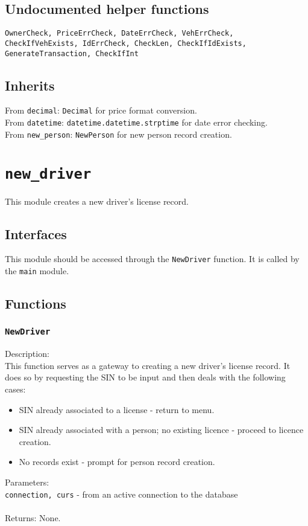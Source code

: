 \documentclass[12pt]{article}
\begin{document}
\subsection{Undocumented helper functions}
\texttt{OwnerCheck, PriceErrCheck, DateErrCheck, VehErrCheck, CheckIfVehExists, IdErrCheck, CheckLen, CheckIfIdExists, GenerateTransaction, CheckIfInt}

\subsection{Inherits}
From \texttt{decimal}: \texttt{Decimal} for price format conversion.\\
From \texttt{datetime}: \texttt{datetime.datetime.strptime} for date error checking.\\
From \texttt{new\_person}: \texttt{NewPerson} for new person record creation.

\newpage
\section{\texttt{new\_driver}}
This module creates a new driver's license record.
\subsection{Interfaces}
This module should be accessed through the \texttt{NewDriver} function. It is called by the \texttt{main} module.

\subsection{Functions}

\subsubsection{\texttt{NewDriver}}
Description:\\
\indent This function serves as a gateway to creating a new driver's license record. It does so by requesting the SIN to be input and then deals with the following cases:
\begin{itemize}
\item SIN already associated to a license - return to menu.
\item SIN already associated with a person; no existing licence - proceed to licence creation.
\item No records exist - prompt for person record creation.
\end{itemize}
Parameters:\\
\indent\texttt{connection, curs} - from an active connection to the database
\\\\
Returns: None.
\end{document}
